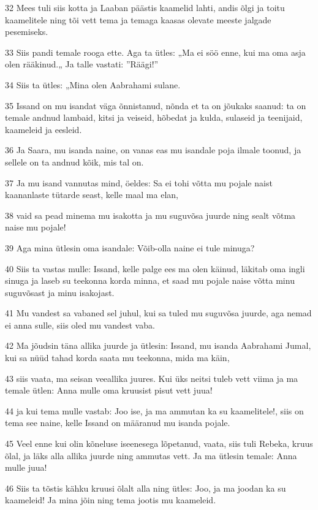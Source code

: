 \par 32 Mees tuli siis kotta ja Laaban päästis kaamelid lahti, andis õlgi ja toitu kaamelitele ning tõi vett tema ja temaga kaasas olevate meeste jalgade pesemiseks.
\par 33 Siis pandi temale rooga ette. Aga ta ütles: „Ma ei söö enne, kui ma oma asja olen rääkinud.„ Ja talle vastati: ”Räägi!”
\par 34 Siis ta ütles: „Mina olen Aabrahami sulane.
\par 35 Issand on mu isandat väga õnnistanud, nõnda et ta on jõukaks saanud: ta on temale andnud lambaid, kitsi ja veiseid, hõbedat ja kulda, sulaseid ja teenijaid, kaameleid ja eesleid.
\par 36 Ja Saara, mu isanda naine, on vanas eas mu isandale poja ilmale toonud, ja sellele on ta andnud kõik, mis tal on.
\par 37 Ja mu isand vannutas mind, öeldes: Sa ei tohi võtta mu pojale naist kaananlaste tütarde seast, kelle maal ma elan,
\par 38 vaid sa pead minema mu isakotta ja mu suguvõsa juurde ning sealt võtma naise mu pojale!
\par 39 Aga mina ütlesin oma isandale: Võib-olla naine ei tule minuga?
\par 40 Siis ta vastas mulle: Issand, kelle palge ees ma olen käinud, läkitab oma ingli sinuga ja laseb su teekonna korda minna, et saad mu pojale naise võtta minu suguvõsast ja minu isakojast.
\par 41 Mu vandest sa vabaned sel juhul, kui sa tuled mu suguvõsa juurde, aga nemad ei anna sulle, siis oled mu vandest vaba.
\par 42 Ma jõudsin täna allika juurde ja ütlesin: Issand, mu isanda Aabrahami Jumal, kui sa nüüd tahad korda saata mu teekonna, mida ma käin,
\par 43 siis vaata, ma seisan veeallika juures. Kui üks neitsi tuleb vett viima ja ma temale ütlen: Anna mulle oma kruusist pisut vett juua!
\par 44 ja kui tema mulle vastab: Joo ise, ja ma ammutan ka su kaamelitele!, siis on tema see naine, kelle Issand on määranud mu isanda pojale.
\par 45 Veel enne kui olin kõneluse iseenesega lõpetanud, vaata, siis tuli Rebeka, kruus õlal, ja läks alla allika juurde ning ammutas vett. Ja ma ütlesin temale: Anna mulle juua!
\par 46 Siis ta tõstis kähku kruusi õlalt alla ning ütles: Joo, ja ma joodan ka su kaameleid! Ja mina jõin ning tema jootis mu kaameleid.
